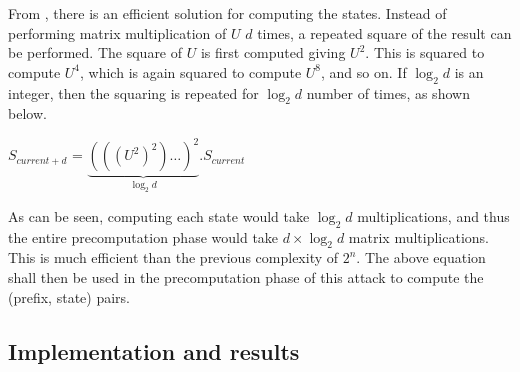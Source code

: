 From \cite{erik-discussions}, there is an efficient solution for computing the states. Instead of performing matrix multiplication of $U$ $d$ times, a repeated square of the result can be performed. The square of $U$ is first computed giving $U^2$. This is squared to compute $U^4$, which is again squared to compute $U^8$, and so on. If $\log_2{d}$ is an integer, then the squaring is repeated for $\log_2{d}$ number of times, as shown below.

\begin{center}
\large{$S_{current + d}$ = $\underbrace{(((U^2)^2) \dotsc )^2}_{\log_2{d}} . S_{current}$}\\
\end{center}
\label{eq:state-trans}

As can be seen, computing each state would take $\log_2{d}$ multiplications, and thus the entire precomputation phase would take $d \times \log_2{d}$ matrix multiplications. This is much efficient than the previous complexity of $2^n$. The above equation shall then be used in the precomputation phase of this attack to compute the (prefix, state) pairs.


\subsection{Implementation and results}

